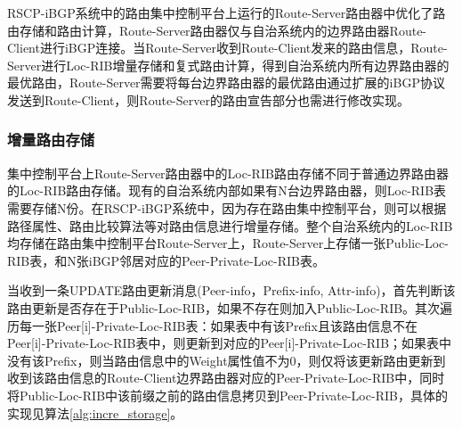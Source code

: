 RSCP-iBGP系统中的路由集中控制平台上运行的Route-Server路由器中优化了路由存储和路由计算，Route-Server路由器仅与自治系统内的边界路由器Route-Client进行iBGP连接。当Route-Server收到Route-Client发来的路由信息，Route-Server进行Loc-RIB增量存储和复式路由计算，得到自治系统内所有边界路由器的最优路由，Route-Server需要将每台边界路由器的最优路由通过扩展的iBGP协议发送到Route-Client，则Route-Server的路由宣告部分也需进行修改实现。

\subsubsection{增量路由存储}

集中控制平台上Route-Server路由器中的Loc-RIB路由存储不同于普通边界路由器的Loc-RIB路由存储。现有的自治系统内部如果有N台边界路由器，则Loc-RIB表需要存储N份。在RSCP-iBGP系统中，因为存在路由集中控制平台，则可以根据路径属性、路由比较算法等对路由信息进行增量存储。整个自治系统内的Loc-RIB均存储在路由集中控制平台Route-Server上，Route-Server上存储一张Public-Loc-RIB表，和N张iBGP邻居对应的Peer-Private-Loc-RIB表。

当收到一条UPDATE路由更新消息(Peer-info，Prefix-info, Attr-info)，首先判断该路由更新是否存在于Public-Loc-RIB，如果不存在则加入Public-Loc-RIB。其次遍历每一张Peer[i]-Private-Loc-RIB表：如果表中有该Prefix且该路由信息不在Peer[i]-Private-Loc-RIB表中，则更新到对应的Peer[i]-Private-Loc-RIB；如果表中没有该Prefix，则当路由信息中的Weight属性值不为0，则仅将该更新路由更新到收到该路由信息的Route-Client边界路由器对应的Peer-Private-Loc-RIB中，同时将Public-Loc-RIB中该前缀之前的路由信息拷贝到Peer-Private-Loc-RIB，具体的实现见算法\ref{alg:incre_storage}。

